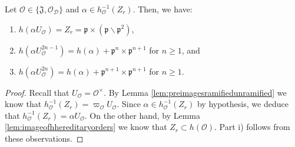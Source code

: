 \documentclass[10pt,a4paper]{amsart}
\newcommand{\D}{\mathcal{D}}
\newcommand{\J}{\mathfrak{J}}
\newcommand{\p}{\mathfrak{p}}
\renewcommand{\O}{\mathcal{O}}
\begin{document}
\begin{lem}\label{lem:charpolyramified}
Let $\O \in \{\J, \O_\D\}$ and $\alpha \in h_\O^{-1}(Z_r)$. Then, we have: 
\begin{enumerate}
    \item [i)]$h(\alpha U_\O) = Z_r = \p \times (\p \smallsetminus \p^2)$,
    \item [ii)]$h(\alpha U_\O^{2n - 1}) = h(\alpha) + \p^n \times \p^{n + 1}$ for $n \geq 1$, and
    \item [iii)]$h(\alpha U_\O^{2n}) = h(\alpha) + \p^{n + 1}\times \p^{n + 1}$ for $n \geq 1$.
\end{enumerate}
\end{lem}

\begin{proof}
Recall that $U_\O = \O^\times$. By Lemma \ref{lem:preimagesramifiedunramified} we know that $h_\O^{-1}(Z_r) = \varpi_\O U_\O$. Since $\alpha \in h_\O^{-1}(Z_r)$ by hypothesis, we deduce that $h_\O^{-1}(Z_r) = \alpha U_\O$. On the other hand, by Lemma \ref{lem:imageofhhereditaryorders} we know that $Z_r \subset h(\O)$. Part i) follows from these observations. 


\end{proof}
\end{document}
